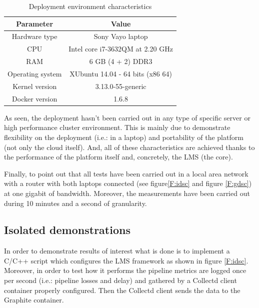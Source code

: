 \begin{table}[htb]
\caption{Deployment environment characteristics}
\begin{center}
\begin{tabular}{|c|c|}
\hline
{\bf Parameter} & {\bf Value} \\ \hline \hline
Hardware type        & Sony Vayo laptop \\ \hline
CPU        & Intel core i7-3632QM at 2.20 GHz  \\ \hline
RAM        & 6 GB (4 + 2) DDR3 \\ \hline
Operating system        & XUbuntu 14.04 - 64 bits (x86 64)  \\ \hline
Kernel version        & 3.13.0-55-generic  \\ \hline
Docker version        & 1.6.8  \\ \hline
\end{tabular}
\label{T:dec}
\end{center}
\end{table}

As seen, the deployment hasn't been carried out in any type of specific server or high performance cluster environment. This is mainly due to demonstrate flexibility on the deployment (i.e.: in a laptop) and portability of the platform (not only the cloud itself). And, all of these characteristics are achieved thanks to the performance of the platform itself and, concretely, the LMS (the core).

Finally, to point out that all tests have been carried out in a local area network with a router with both laptops connected (see figure\ref{F:idsc} and figure \ref{F:gdsc}) at one gigabit of bandwidth. Moreover, the measurements have been carried out during 10 minutes and a second of granularity.

\subsection{Isolated demonstrations}

In order to demonstrate results of interest what is done is to implement a C/C++ script which configures the LMS framework as shown in figure \ref{F:idsc}. Moreover, in order to test how it performs the pipeline metrics are logged once per second (i.e.: pipeline losses and delay) and gathered by a Collectd client container properly configured. Then the Collectd client sends the data to the Graphite container. 

